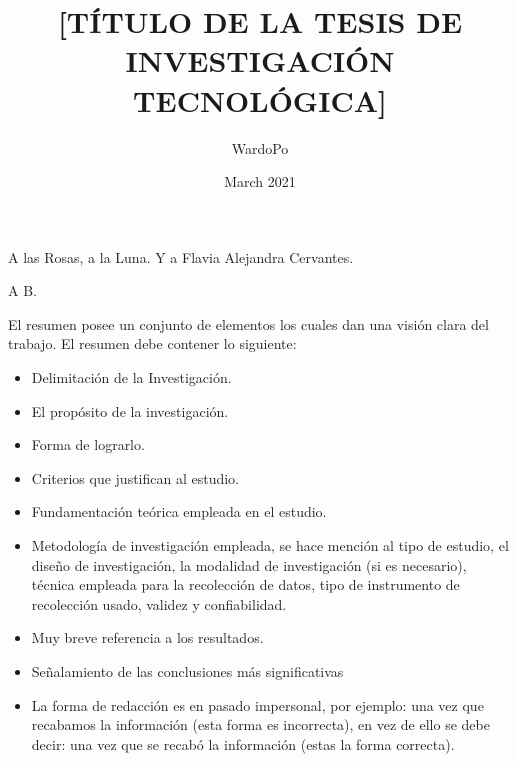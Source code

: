 \documentclass[12]{tesis_tecnologica}
\title{[TÍTULO DE LA TESIS DE INVESTIGACIÓN TECNOLÓGICA]}
\author{WardoPo}
\date{March 2021}
\begin{document}


\begin{dedicatoria}
A las Rosas, a la Luna.
Y a Flavia Alejandra Cervantes.
\end{dedicatoria}

\begin{agradecimientos}
A B.
\end{agradecimientos}

\tableofcontents
\listoffigures
\listoftables

\begin{resumen}
El resumen posee un conjunto de elementos los cuales dan una visión clara del trabajo. El resumen debe contener lo siguiente: 

\begin{itemize}
    \item Delimitación de la Investigación.
    \item El propósito de la investigación. 
    \item Forma de lograrlo. 
    \item Criterios que justifican al estudio. 
    \item Fundamentación teórica empleada en el estudio. 
    \item Metodología de investigación empleada, se hace mención al tipo de estudio, el diseño de investigación, la modalidad de investigación (si es necesario),  técnica empleada para la recolección de datos, tipo de instrumento de recolección usado, validez y confiabilidad.
    \item Muy breve referencia a los resultados. 
    \item Señalamiento de las conclusiones más significativas 
    \item La forma de redacción es en pasado impersonal, por ejemplo: una vez que recabamos la información (esta forma es incorrecta), en vez de ello se debe decir: una vez que se recabó la información (estas la forma correcta). 
\end{itemize}

\end{resumen}

\begin{abstract}
    
\end{abstract}

\begin{palabras_clave}

\end{palabras_clave}
\end{document}
